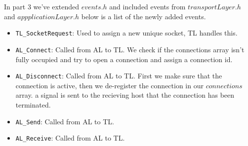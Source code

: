 In part 3 we've extended $events.h$ and included events from $transportLayer.h$ and $appplicationLayer.h$
below is a list of the newly added events.
\begin{itemize}
\item \texttt{TL\_SocketRequest}: Used to assign a new unique socket, TL handles this.

\item \texttt{AL\_Connect}: Called from AL to TL.
We check if the connections array isn't fully occupied and try to open a connection and assign a connection id.

\item \texttt{AL\_Disconnect}: Called from AL to TL. First we make sure that the connection is active, then we de-register the connection in our $connections$ array.
a signal is sent to the recieving host that the connection has been terminated.

\item \texttt{AL\_Send}: Called from AL to TL.

\item \texttt{AL\_Receive}: Called from AL to TL.

\end{itemize}

